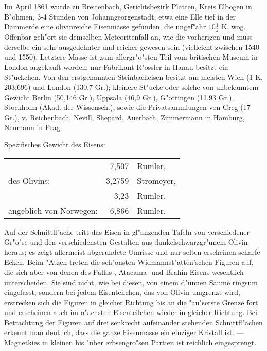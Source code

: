 \documentclass[a4paper, 11pt, oneside]{article}
\begin{document}
Im April 1861 wurde zu Breitenbach, Gerichtsbezirk Platten, Kreis Elbogen in B"ohmen, 3-4 Stunden von Johanngeorgenstadt, etwa eine Elle tief in der Dammerde eine olivinreiche Eisenmasse gefunden, die ungef"ahr $10\frac{1}{2}$ K. wog. Offenbar geh"ort sie demselben Meteoritenfall an, wie die vorherigen und muss derselbe ein sehr ausgedehnter und reicher gewesen sein (vielleicht zwischen 1540 und 1550). Letztere Masse ist zum allergr"o"sten Teil vom britischen Museum in London angekauft worden; nur Fabrikant R"ossler in Hanau besitzt ein St"uckchen. Von den erstgenannten Steinbacheisen besitzt am meisten Wien (1 K. 203,696) und London (130,7 Gr.); kleinere St"ucke oder solche von unbekanntem Gewicht Berlin (50,146 Gr.), Uppsala (46,9 Gr.), G"ottingen (11,93 Gr.), Stockholm (Akad. der Wissensch.), sowie die Privatsammlungen von Greg (17 Gr.), v. Reichenbach, Nevill, Shepard, Auerbach, Zimmermann in Hamburg, Neumann in Prag.

Spezifisches Gewicht des Eisens:
\begin{table}[!ht]
    \centering
    \begin{tabular}{l r l}
         & 7,507 & Rumler,\\
        des Olivins: & 3,2759 & Stromeyer,\\
         & 3,23 & Rumler,\\
        angeblich von Norwegen: & 6,866 & Rumler.\\
    \end{tabular}
\end{table}

Auf der Schnittfl"ache tritt das Eisen in gl"anzenden Tafeln von verschiedener Gr"o"se und den verschiedensten Gestalten aus dunkelschwarzgr"unem Olivin heraus; es zeigt allermeist abgerundete Umrisse und nur selten erscheinen scharfe Ecken. Beim "Atzen treten die sch"onsten Widmannst"atten'schen Figuren auf, die sich aber von denen des Pallas-, Atacama- und Brahin-Eisens wesentlich unterscheiden. Sie sind nicht, wie bei diesen, von einem d"unnen Saume ringsum eingefasst, sondern bei jedem Eisenteilchen, das von Olivin umgrenzt wird, erstrecken sich die Figuren in gleicher Richtung bis an die "au"serste Grenze fort und erscheinen auch im n"achsten Eisenteilchen wieder in gleicher Richtung. Bei Betrachtung der Figuren auf drei senkrecht aufeinander stehenden Schnittfl"achen erkennt man deutlich, dass die ganze Eisenmasse ein einziger Kristall ist. --- Magnetkies in kleinen bis "uber erbsengro"sen Partien ist reichlich eingesprengt.
\end{document}
